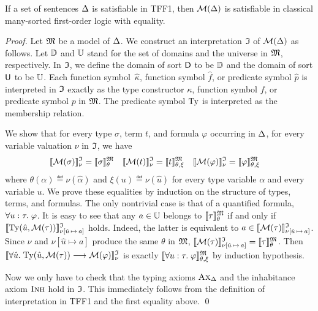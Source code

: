 \begin{theorem}%
\label{thm:mon_sound}%
\afterDot
If a set of sentences $\mathrm{\Delta}$ is satisfiable in TFF1,
then $\mathcal{M}(\mathrm{\Delta})$ is satisfiable in classical
many-sorted first-order logic with equality.
\end{theorem}
\begin{proof}
Let $\mathfrak{M}$ be a model of $\mathrm{\Delta}$.
We construct an interpretation $\mathfrak{I}$ of $\mathcal{M}(\mathrm{\Delta})$ as follows.
Let $\mathbb{D}$ and $\mathbb{U}$ stand for
the set of domains and the universe in $\mathfrak{M}$, respectively.
In $\mathfrak{I}$, we define the domain of sort $\mathsf{D}$ to be $\mathbb{D}$
and the domain of sort $\mathsf{U}$ to be $\mathbb{U}$.
Each function symbol~$\hat{\kappa}$, function symbol $\hat{f}$,
or predicate symbol $\hat{p}$ is interpreted in $\mathfrak{I}$
exactly as the type constructor $\kappa$, function symbol $f$,
or predicate symbol $p$ in $\mathfrak{M}$.
The predicate symbol $\mathrm{Ty}$ is interpreted as the membership relation.

We show that for every type $\sigma$, term $t$,
and formula $\varphi$ occurring in $\mathrm{\Delta}$,
for every variable valuation $\nu$ in $\mathfrak{I}$, we have
\begin{align*}
\llbracket \mathcal{M}(\sigma) \rrbracket^{\mathfrak{I}}_{\nu} &= \llbracket \sigma \rrbracket^{\mathfrak{M}}_{\theta} &
\llbracket \mathcal{M}(t) \rrbracket^{\mathfrak{I}}_{\nu} &= \llbracket t \rrbracket^{\mathfrak{M}}_{\theta,\xi} &
\llbracket \mathcal{M}(\varphi) \rrbracket^{\mathfrak{I}}_{\nu} &= \llbracket \varphi \rrbracket^{\mathfrak{M}}_{\theta,\xi}
\end{align*}
where $\theta(\alpha) \eqdef \nu(\hat{\alpha})$ and
$\xi(u) \eqdef \nu(\hat{u})$ for every
type variable $\alpha$ and every variable $u$.
%
We prove these equalities by induction on the structure
of types, terms, and formulas. The only nontrivial case is
that of a quantified formula, $\forall u \mathrel{:} \tau .\; \varphi$.
It is easy to see that any $a \in \mathbb{U}$ belongs
to $\llbracket \tau \rrbracket^{\mathfrak{M}}_\theta$ if and only if
$\llbracket \mathrm{Ty}(\hat{u},\mathcal{M}(\tau)) \rrbracket^{\mathfrak{I}}_{\nu[\hat{u}\,\mapsto\,a]}$
holds. Indeed, the latter is equivalent to
$a \in \llbracket \mathcal{M}(\tau) \rrbracket^{\mathfrak{I}}_{\nu[\hat{u}\,\mapsto\,a]}$.
Since $\nu$ and $\nu[\hat{u} \mapsto a]$ produce the same
$\theta$ in $\mathfrak{M}$,
$\llbracket \mathcal{M}(\tau) \rrbracket^{\mathfrak{I}}_{\nu[\hat{u}\,\mapsto\,a]} =
\llbracket \tau \rrbracket^{\mathfrak{M}}_\theta$.
Then
$\llbracket \forall \hat{u} .\; \mathrm{Ty}(\hat{u},\mathcal{M}(\tau))
\longrightarrow \mathcal{M}(\varphi) \rrbracket^{\mathfrak{I}}_{\nu}$ is exactly
$\llbracket \forall u \mathrel{:} \tau .\; \varphi \rrbracket^{\mathfrak{M}}_{\theta,\xi}$
by induction hypothesis.

Now we only have to check that the typing axioms
$\text{\sc Ax}_{\mathrm{\Delta}}$ and the inhabitance axiom $\text{\sc Inh}$ hold in $\mathfrak{I}$.
This immediately follows from the definition of
interpretation in TFF1 and the first equality above.
\qed
\end{proof}

